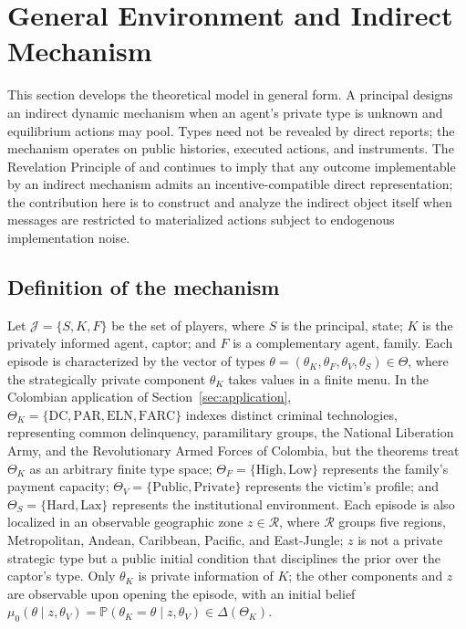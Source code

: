 \documentclass[review,authoryear,12pt]{elsarticle}
\theoremstyle{plain}
\theoremstyle{definition}
\newcommand{\Prob}{\mathbb{P}}
\newcommand{\ThetaK}{\Theta_K}
\newcommand{\1}{\mathbf{1}}
\begin{document}
\section{General Environment and Indirect Mechanism}\label{sec:model}

This section develops the theoretical model in general form. A principal designs an indirect dynamic mechanism when an agent's private type is unknown and equilibrium actions may pool. Types need not be revealed by direct reports; the mechanism operates on public histories, executed actions, and instruments. The Revelation Principle of \citet{Gibbard1973} and \citet{Myerson1979IC,Myerson1981} continues to imply that any outcome implementable by an indirect mechanism admits an incentive-compatible direct representation; the contribution here is to construct and analyze the indirect object itself when messages are restricted to materialized actions subject to endogenous implementation noise.

\subsection{Definition of the mechanism}\label{subsec:def-mecanismo}


Let $\mathcal{J}=\{S,K,F\}$ be the set of players, where $S$ is the principal, state; $K$ is the privately informed agent, captor; and $F$ is a complementary agent, family. Each episode is characterized by the vector of types $\theta=(\theta_K,\theta_F,\theta_V,\theta_S)\in\Theta$, where the strategically private component $\theta_K$ takes values in a finite menu. In the Colombian application of Section~\ref{sec:application}, $\ThetaK=\{\text{DC},\text{PAR},\text{ELN},\text{FARC}\}$ indexes distinct criminal technologies, representing common delinquency, paramilitary groups, the National Liberation Army, and the Revolutionary Armed Forces of Colombia, but the theorems treat $\ThetaK$ as an arbitrary finite type space; $\Theta_F=\{\text{High},\text{Low}\}$ represents the family's payment capacity; $\Theta_V=\{\text{Public},\text{Private}\}$ represents the victim's profile; and $\Theta_S=\{\text{Hard},\text{Lax}\}$ represents the institutional environment. Each episode is also localized in an observable geographic zone $z\in\mathcal{R}$, where $\mathcal{R}$ groups five regions, Metropolitan, Andean, Caribbean, Pacific, and East-Jungle; $z$ is not a private strategic type but a public initial condition that disciplines the prior over the captor's type. Only $\theta_K$ is private information of $K$; the other components and $z$ are observable upon opening the episode, with an initial belief $\mu_0(\theta\mid z,\theta_V)=\Prob(\theta_K=\theta\mid z,\theta_V)\in\Delta(\ThetaK)$.
\end{document}
